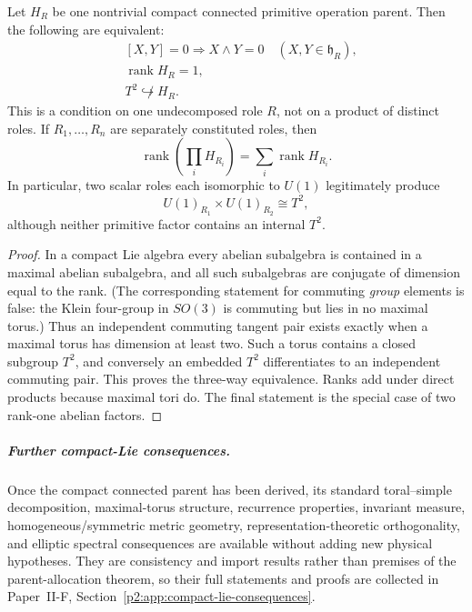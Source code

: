 \documentclass[12pt,a4paper]{article}
\begin{document}
\begin{theorem}
\label{p2:thm:role-local-torus-obstruction}
Let \(H_R\) be one nontrivial compact connected primitive operation parent.
Then the following are equivalent:
\[
\begin{split}
&[X,Y]=0\Longrightarrow X\wedge Y=0
   \quad(X,Y\in\mathfrak h_R),\\
&\operatorname{rank}H_R=1,\\
&T^2\not\hookrightarrow H_R .
\end{split}
\]
This is a condition on one undecomposed role \(R\), not on a product of
distinct roles.  If \(R_1,\ldots,R_n\) are separately constituted roles, then
\[
 \operatorname{rank}\!\left(\prod_i H_{R_i}\right)
 =\sum_i\operatorname{rank}H_{R_i}.
\]
In particular, two scalar roles each isomorphic to \(U(1)\) legitimately
produce
\[
 U(1)_{R_1}\times U(1)_{R_2}\cong T^2,
\]
although neither primitive factor contains an internal \(T^2\).
\end{theorem}

\begin{proof}
In a compact Lie algebra every abelian subalgebra is contained in a maximal
abelian subalgebra, and all such subalgebras are conjugate of dimension equal
to the rank.  (The corresponding statement for commuting \emph{group}
elements is false: the Klein four-group in \(SO(3)\) is commuting but lies in
no maximal torus.)  Thus an independent commuting tangent pair exists exactly
when a maximal torus has dimension at least two.  Such a torus contains a
closed subgroup \(T^2\), and conversely an embedded \(T^2\) differentiates to
an independent commuting pair.  This proves the three-way equivalence.
Ranks add under direct products because maximal tori do.  The final statement
is the special case of two rank-one abelian factors.
\end{proof}

\subparagraph{Further compact-Lie consequences.}
Once the compact connected parent has been derived, its standard toral--simple
decomposition, maximal-torus structure, recurrence properties, invariant
measure, homogeneous/symmetric metric geometry, representation-theoretic
orthogonality, and elliptic spectral consequences are available without adding
new physical hypotheses.  They are consistency and import results rather than
premises of the parent-allocation theorem, so their full statements and proofs
are collected in Paper~II-F, Section~\ref{p2:app:compact-lie-consequences}.

\clearpage
\end{document}
